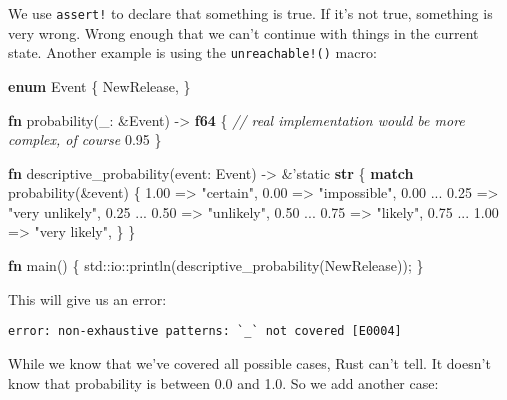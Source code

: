 \documentclass[a4paper,]{book}
\newenvironment{Shaded}{\begin{snugshade}}{\end{snugshade}}
\newcommand{\KeywordTok}[1]{\textcolor[rgb]{0.13,0.29,0.53}{\textbf{{#1}}}}
\newcommand{\DecValTok}[1]{\textcolor[rgb]{0.00,0.00,0.81}{{#1}}}
\newcommand{\StringTok}[1]{\textcolor[rgb]{0.31,0.60,0.02}{{#1}}}
\newcommand{\CommentTok}[1]{\textcolor[rgb]{0.56,0.35,0.01}{\textit{{#1}}}}
\newcommand{\OtherTok}[1]{\textcolor[rgb]{0.56,0.35,0.01}{{#1}}}
\newcommand{\NormalTok}[1]{{#1}}
\begin{document}
We use \texttt{assert!} to declare that something is true. If it's not
true, something is very wrong. Wrong enough that we can't continue with
things in the current state. Another example is using the
\texttt{unreachable!()} macro:

\begin{Shaded}
\begin{Highlighting}[]
\KeywordTok{enum} \NormalTok{Event \{}
    \NormalTok{NewRelease,}
\NormalTok{\}}

\KeywordTok{fn} \NormalTok{probability(_: &Event) -> }\KeywordTok{f64} \NormalTok{\{}
    \CommentTok{// real implementation would be more complex, of course}
    \DecValTok{0.95}
\NormalTok{\}}

\KeywordTok{fn} \NormalTok{descriptive_probability(event: Event) -> &}\OtherTok{'static} \KeywordTok{str} \NormalTok{\{}
    \KeywordTok{match} \NormalTok{probability(&event) \{}
        \DecValTok{1.00} \NormalTok{=> }\StringTok{"certain"}\NormalTok{,}
        \DecValTok{0.00} \NormalTok{=> }\StringTok{"impossible"}\NormalTok{,}
        \DecValTok{0.00} \NormalTok{... }\DecValTok{0.25} \NormalTok{=> }\StringTok{"very unlikely"}\NormalTok{,}
        \DecValTok{0.25} \NormalTok{... }\DecValTok{0.50} \NormalTok{=> }\StringTok{"unlikely"}\NormalTok{,}
        \DecValTok{0.50} \NormalTok{... }\DecValTok{0.75} \NormalTok{=> }\StringTok{"likely"}\NormalTok{,}
        \DecValTok{0.75} \NormalTok{... }\DecValTok{1.00} \NormalTok{=> }\StringTok{"very likely"}\NormalTok{,}
    \NormalTok{\}}
\NormalTok{\}}

\KeywordTok{fn} \NormalTok{main() \{}
    \NormalTok{std::io::println(descriptive_probability(NewRelease));}
\NormalTok{\}}
\end{Highlighting}
\end{Shaded}

This will give us an error:

\begin{verbatim}
error: non-exhaustive patterns: `_` not covered [E0004]
\end{verbatim}

While we know that we've covered all possible cases, Rust can't tell. It
doesn't know that probability is between 0.0 and 1.0. So we add another
case:
\end{document}
